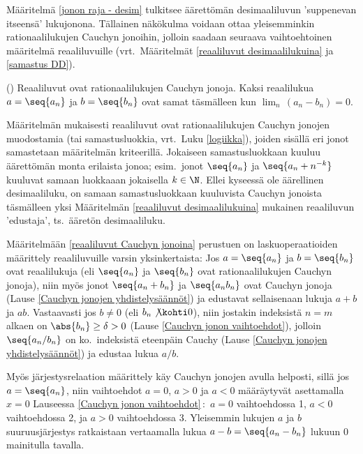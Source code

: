 Määritelmä \ref{jonon raja - desim} tulkitsee äärettömän desimaaliluvun 'suppenevan itseensä'
lukujonona. Tällainen näkökulma voidaan ottaa yleisemminkin rationaalilukujen Cauchyn jonoihin,
jolloin saadaan seuraava vaihtoehtoinen määritelmä reaaliluvuille (vrt.\ Määritelmät
\ref{reaaliluvut desimaalilukuina} ja \ref{samastus DD}).
\begin{Def} \label{reaaliluvut Cauchyn jonoina} 
() Reaaliluvut ovat rationaalilukujen Cauchyn jonoja. Kaksi
reaalilukua $a=\seq{a_n}$ ja $b=\seq{b_n}$ ovat samat täsmälleen kun $\lim_n\,(a_n - b_n) = 0$. 
\end{Def}
Määritelmän mukaisesti reaaliluvut ovat rationaalilukujen Cauchyn jonojen muodostamia 
 (tai samastusluokkia, vrt.\ Luku \ref{logiikka}), joiden sisällä 
eri jonot samastetaan määritelmän kriteerillä. Jokaiseen samastusluokkaan kuuluu äärettömän
monta erilaista jonoa; esim.\ jonot $\seq{a_n}$ ja $\seq{a_n + n^{-k}}$ kuuluvat samaan
luokkaaan jokaisella $k\in\N$. Ellei kyseessä ole äärellinen desimaaliluku, on samaan 
samastusluokkaan kuuluvista Cauchyn jonoista täsmälleen yksi Määritelmän
\ref{reaaliluvut desimaalilukuina} mukainen reaaliluvun 'edustaja', ts.\ ääretön desimaaliluku.

Määritelmään \ref{reaaliluvut Cauchyn jonoina} perustuen on laskuoperaatioiden määrittely 
reaaliluvuille varsin yksinkertaista: Jos $a=\seq{a_n}$ ja $b=\seq{b_n}$ ovat reaalilukuja 
(eli $\seq{a_n}$ ja $\seq{b_n}$ ovat rationaalilukujen Cauchyn jonoja), niin myös jonot
$\seq{a_n + b_n}$ ja $\seq{a_n b_n}$ ovat Cauchyn jonoja 
(Lause \ref{Cauchyn jonojen yhdistelysäännöt}) ja edustavat sellaisenaan lukuja $a+b$ ja $ab$.
Vastaavasti jos $b \neq 0$ (eli $b_n \not\kohti 0$), niin jostakin indeksistä $n=m$ alkaen on
$\abs{b_n} \ge \delta>0$ (Lause \ref{Cauchyn jonon vaihtoehdot}), jolloin $\seq{a_n/b_n}$ on
ko.\ indeksistä eteenpäin Cauchy (Lause \ref{Cauchyn jonojen yhdistelysäännöt}) ja edustaa
lukua $a/b$.

Myös järjestysrelaation määrittely käy Cauchyn jonojen avulla helposti, sillä jos
$a=\seq{a_n}$, niin vaihtoehdot $a=0$, $a>0$ ja $a<0$ määräytyvät asettamalla $x=0$ Lauseessa
\ref{Cauchyn jonon vaihtoehdot}\,: $\,a=0$ vaihtoehdossa 1, $a<0$ vaihtoehdossa 2, ja $a>0$
vaihtoehdossa 3. Yleisemmin lukujen $a$ ja $b$ suuruusjärjestys ratkaistaan vertaamalla lukua
$a-b=\seq{a_n-b_n}$ lukuun $0$ mainitulla tavalla.


